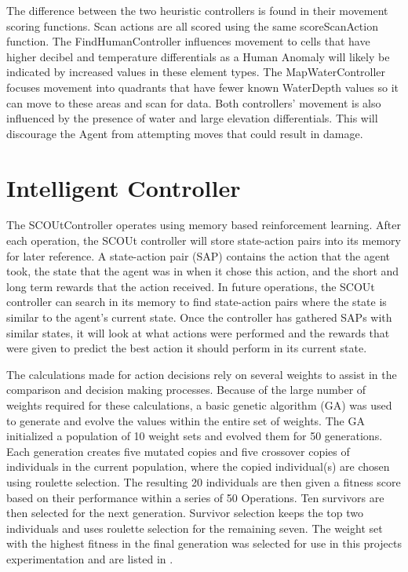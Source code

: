 The difference between the two heuristic controllers is found in their movement scoring functions.
Scan actions are all scored using the same scoreScanAction function.
The FindHumanController influences movement to cells that have higher decibel and temperature differentials as a Human Anomaly will likely be indicated by increased values in these element types.
The MapWaterController focuses movement into quadrants that have fewer known WaterDepth values so it can move to these areas and scan for data.
Both controllers' movement is also influenced by the presence of water and large elevation differentials.
This will discourage the Agent from attempting moves that could result in damage.


\section{Intelligent Controller}
The SCOUtController operates using memory based reinforcement learning.
After each operation, the SCOUt controller will store state-action pairs into its memory for later reference.
A state-action pair (SAP) contains the action that the agent took, the state that the agent was in when it chose this action, and the short and long term rewards that the action received.
In future operations, the SCOUt controller can search in its memory to find state-action pairs where the state is similar to the agent's current state.
Once the controller has gathered SAPs with similar states, it will look at what actions were performed and the rewards that were given to predict the best action it should perform in its current state.

The calculations made for action decisions rely on several weights to assist in the comparison and decision making processes.
Because of the large number of weights required for these calculations, a basic genetic algorithm (GA) was used to generate and evolve the values within the entire set of weights.
The GA initialized a population of 10 weight sets and evolved them for 50 generations.
Each generation creates five mutated copies and five crossover copies of individuals in the current population, where the copied individual(s) are chosen using roulette selection. 
The resulting 20 individuals are then given a fitness score based on their performance within a series of 50 Operations.
Ten survivors are then selected for the next generation.
Survivor selection keeps the top two individuals and uses roulette selection for the remaining seven.
The weight set with the highest fitness in the final generation was selected for use in this projects experimentation and are listed in .


